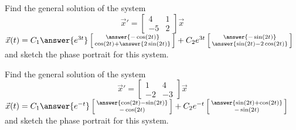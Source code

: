 \documentclass{ximera}
\begin{document}
\begin{exercise}%
    Find the general solution of the system
    \begin{equation*}
        {\vec{x}}' = 
        \begin{bmatrix} 
            4 & 1 \\ 
            -5 & 2 
        \end{bmatrix} \vec{x}
    \end{equation*}
    $\vec{x}(t) = C_1\answer{e^{3t}} \left[\begin{smallmatrix} \answer{-\cos(2t)} \\ \cos(2t) + \answer{2\sin(2t)} \end{smallmatrix}\right] + C_2e^{3t}\left[\begin{smallmatrix} \answer{-\sin(2t)} \\ \answer{\sin(2t) - 2 \cos(2t)} \end{smallmatrix}\right]$
    and sketch the phase portrait for this system.
\end{exercise}


\begin{exercise}%
    Find the general solution of the system
    \begin{equation*}
        {\vec{x}}' = 
        \begin{bmatrix} 
            1 & 4 \\ 
            -2 & -3 
        \end{bmatrix} \vec{x}
    \end{equation*}
    $\vec{x}(t) = C_1\answer{e^{-t}}\left[\begin{smallmatrix} \answer{\cos(2t) - \sin(2t)} \\ -\cos(2t) \end{smallmatrix}\right] + C_2e^{-t}\left[\begin{smallmatrix} \answer{\sin(2t) + \cos(2t)} \\ -\sin(2t) \end{smallmatrix}\right]$
    and sketch the phase portrait for this system.
\end{exercise}
\end{document}
